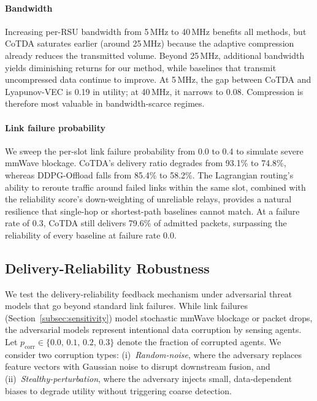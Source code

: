 \documentclass[final,3p,times,review,sort&compress]{elsarticle}
\begin{document}
\paragraph{Bandwidth}
Increasing per-RSU bandwidth from 5\,MHz to 40\,MHz benefits all methods, but CoTDA saturates earlier (around 25\,MHz) because the adaptive compression already reduces the transmitted volume. Beyond 25\,MHz, additional bandwidth yields diminishing returns for our method, while baselines that transmit uncompressed data continue to improve. At 5\,MHz, the gap between CoTDA and Lyapunov-VEC is 0.19 in utility; at 40\,MHz, it narrows to 0.08. Compression is therefore most valuable in bandwidth-scarce regimes.

\paragraph{Link failure probability}
We sweep the per-slot link failure probability from 0.0 to 0.4 to simulate severe mmWave blockage. CoTDA's delivery ratio degrades from 93.1\% to 74.8\%, whereas DDPG-Offload falls from 85.4\% to 58.2\%. The Lagrangian routing's ability to reroute traffic around failed links within the same slot, combined with the reliability score's down-weighting of unreliable relays, provides a natural resilience that single-hop or shortest-path baselines cannot match. At a failure rate of 0.3, CoTDA still delivers 79.6\% of admitted packets, surpassing the reliability of every baseline at failure rate 0.0.

\subsection{Delivery-Reliability Robustness}
\label{subsec:trust_robust}

We test the delivery-reliability feedback mechanism under adversarial threat models that go beyond standard link failures. While link failures (Section~\ref{subsec:sensitivity}) model stochastic mmWave blockage or packet drops, the adversarial models represent intentional data corruption by sensing agents. Let $p_{\mathrm{corr}}\in\{0.0,\,0.1,\,0.2,\,0.3\}$ denote the fraction of corrupted agents. We consider two corruption types: (i)~\emph{Random-noise}, where the adversary replaces feature vectors with Gaussian noise to disrupt downstream fusion, and (ii)~\emph{Stealthy-perturbation}, where the adversary injects small, data-dependent biases to degrade utility without triggering coarse detection.
\end{document}
